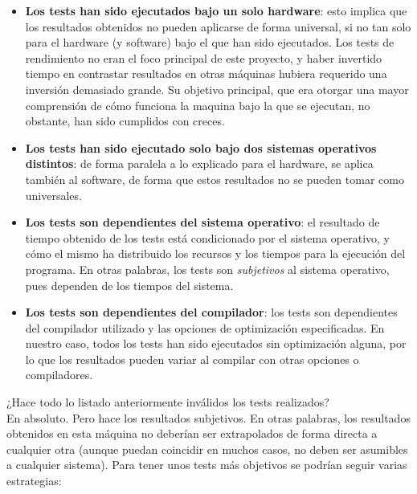 \begin{itemize}
	\item \textbf{Los tests han sido ejecutados bajo un solo hardware}: esto implica que los resultados obtenidos no pueden aplicarse de forma universal, si no tan solo para el hardware (y software) bajo el que han sido ejecutados. Los tests de rendimiento no eran el foco principal de este proyecto, y haber invertido tiempo en contrastar resultados en otras máquinas hubiera requerido una inversión demasiado grande. Su objetivo principal, que era otorgar una mayor comprensión de cómo funciona la maquina bajo la que se ejecutan, no obstante, han sido cumplidos con creces.
	\item \textbf{Los tests han sido ejecutado solo bajo dos sistemas operativos distintos}: de forma paralela a lo explicado para el hardware, se aplica también al software, de forma que estos resultados no se pueden tomar como universales.
	\item \textbf{Los tests son dependientes del sistema operativo}: el resultado de tiempo obtenido de los tests está condicionado por el sistema operativo, y cómo el mismo ha distribuido los recursos y los tiempos para la ejecución del programa. En otras palabras, los tests son \emph{subjetivos} al sistema operativo, pues dependen de los tiempos del sistema.
	\item \textbf{Los tests son dependientes del compilador}: los tests son dependientes del compilador utilizado y las opciones de optimización especificadas. En nuestro caso, todos los tests han sido ejecutados sin optimización alguna, por lo que los resultados pueden variar al compilar con otras opciones o compiladores.
\end{itemize}

¿Hace todo lo listado anteriormente inválidos los tests realizados?\\

En absoluto. Pero hace los resultados subjetivos. En otras palabras, los resultados obtenidos en esta máquina no deberían ser extrapolados de forma directa a cualquier otra (aunque puedan coincidir en muchos casos, no deben ser asumibles a cualquier sistema). Para tener unos tests más objetivos se podrían seguir varias estrategias:

